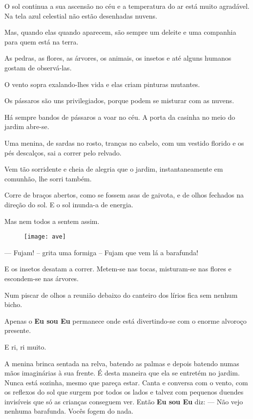 O sol continua a sua ascensão no céu e a temperatura do ar está muito agradável.
Na tela azul celestial não estão desenhadas nuvens.

Mas, quando elas quando aparecem, são sempre um deleite e uma companhia para quem está na terra.

As pedras, as flores, as árvores, os animais, os insetos e até alguns humanos gostam de observá-las.

O vento sopra exalando-lhes vida e elas criam pinturas mutantes.

Os pássaros são uns privilegiados, porque podem se misturar com as nuvens.

Há sempre bandos de pássaros a voar no céu.
\bigbreak
A porta da casinha no meio do jardim abre-se.

Uma menina, de sardas no rosto, tranças no cabelo, com um vestido florido e os pés descalços, sai a correr pelo relvado.

Vem tão sorridente e cheia de alegria que o jardim, instantaneamente em comunhão, lhe sorri também.

Corre de braços abertos, como se fossem asas de gaivota, e de olhos fechados na direção do sol. E o sol inunda-a de energia.

Mas nem todos a sentem assim.

\begin{figure}[h]
    \centering
    \texttt{[image: ave]}
\end{figure}

\bigbreak
— Fujam! – grita uma formiga – Fujam que vem lá a barafunda!
\bigbreak

E os insetos desatam a correr. Metem-se nas tocas, misturam-se nas flores e escondem-se nas árvores.

Num piscar de olhos a reunião debaixo do canteiro dos lírios fica sem nenhum bicho.

Apenas o \textbf{Eu sou Eu} permanece onde está divertindo-se com o enorme alvoroço presente.

E ri, ri muito.

A menina brinca sentada na relva, batendo as palmas e depois batendo numas mãos imaginárias à sua frente. É desta maneira que ela se entretém no jardim. Nunca está sozinha, mesmo que pareça estar. Canta e conversa com o vento, com os reflexos do sol que surgem por todos os lados e talvez com pequenos duendes invisíveis que só as crianças conseguem ver.
\bigbreak
Então \textbf{Eu sou Eu} diz:
\bigbreak
— Não vejo nenhuma barafunda. Vocês fogem do nada.


